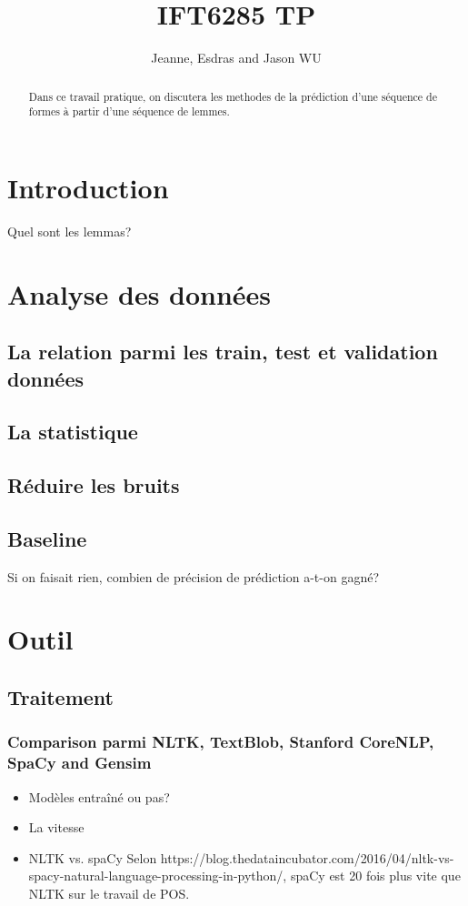 \documentclass[a4paper]{article}
\title{IFT6285 TP}
\author{Jeanne, Esdras and Jason WU}
\begin{document}
\maketitle

\begin{abstract}
Dans ce travail pratique,  on discutera les methodes de la prédiction d'une séquence de formes à partir d'une séquence de lemmes.
\end{abstract}

\section{Introduction}
Quel sont les lemmas?

\section{Analyse des données}

\subsection{La relation parmi les train, test et validation données}

\subsection{La statistique}

\subsection{Réduire les bruits}

\subsection{Baseline}
Si on faisait rien, combien de précision de prédiction a-t-on gagné?

\section{Outil}
\subsection{Traitement}
\subsubsection{Comparison parmi NLTK, TextBlob, Stanford CoreNLP, SpaCy and Gensim}
\begin{itemize}
\item Modèles entraîné ou pas?
\item La vitesse
\item NLTK vs. spaCy \cite{noauthor_nltk_2016} Selon https://blog.thedataincubator.com/2016/04/nltk-vs-spacy-natural-language-processing-in-python/, spaCy est 20 fois plus vite que NLTK sur le travail de POS.
\end{itemize}
\end{document}
